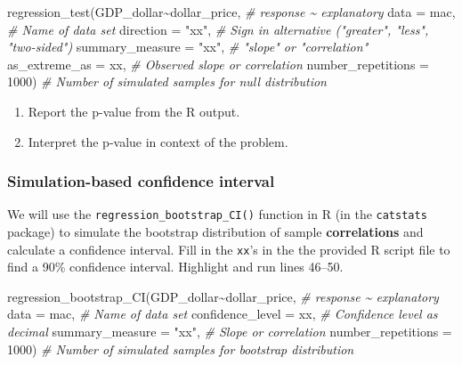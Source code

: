 \documentclass[
]{report}
\newenvironment{Shaded}{\begin{snugshade}}{\end{snugshade}}
\newcommand{\AttributeTok}[1]{\textcolor[rgb]{0.77,0.63,0.00}{#1}}
\newcommand{\CommentTok}[1]{\textcolor[rgb]{0.56,0.35,0.01}{\textit{#1}}}
\newcommand{\DecValTok}[1]{\textcolor[rgb]{0.00,0.00,0.81}{#1}}
\newcommand{\FunctionTok}[1]{\textcolor[rgb]{0.00,0.00,0.00}{#1}}
\newcommand{\NormalTok}[1]{#1}
\newcommand{\SpecialCharTok}[1]{\textcolor[rgb]{0.00,0.00,0.00}{#1}}
\newcommand{\StringTok}[1]{\textcolor[rgb]{0.31,0.60,0.02}{#1}}
\begin{document}
\begin{Shaded}
\begin{Highlighting}[]
\FunctionTok{regression\_test}\NormalTok{(GDP\_dollar}\SpecialCharTok{\textasciitilde{}}\NormalTok{dollar\_price, }\CommentTok{\# response \textasciitilde{} explanatory}
               \AttributeTok{data =}\NormalTok{ mac, }\CommentTok{\# Name of data set}
               \AttributeTok{direction =} \StringTok{"xx"}\NormalTok{, }\CommentTok{\# Sign in alternative ("greater", "less", "two{-}sided")}
               \AttributeTok{summary\_measure  =} \StringTok{"xx"}\NormalTok{, }\CommentTok{\# "slope" or "correlation"}
               \AttributeTok{as\_extreme\_as =}\NormalTok{ xx, }\CommentTok{\# Observed slope or correlation}
               \AttributeTok{number\_repetitions =} \DecValTok{1000}\NormalTok{) }\CommentTok{\# Number of simulated samples for null distribution}
\end{Highlighting}
\end{Shaded}

\begin{enumerate}
\def\labelenumi{\arabic{enumi}.}
\setcounter{enumi}{7}
\item
  Report the p-value from the R output.
  \vspace{0.3in}
\item
  Interpret the p-value in context of the problem.
  \vspace{0.8in}
\end{enumerate}

\hypertarget{simulation-based-confidence-interval-1}{%
\subsubsection*{Simulation-based confidence interval}\label{simulation-based-confidence-interval-1}}

We will use the \texttt{regression\_bootstrap\_CI()} function in R (in the \texttt{catstats} package) to simulate the bootstrap distribution of sample \textbf{correlations} and calculate a confidence interval. Fill in the \texttt{xx}'s in the the provided R script file to find a 90\% confidence interval. Highlight and run lines 46--50.

\begin{Shaded}
\begin{Highlighting}[]
\FunctionTok{regression\_bootstrap\_CI}\NormalTok{(GDP\_dollar}\SpecialCharTok{\textasciitilde{}}\NormalTok{dollar\_price, }\CommentTok{\# response \textasciitilde{} explanatory}
   \AttributeTok{data =}\NormalTok{ mac, }\CommentTok{\# Name of data set}
   \AttributeTok{confidence\_level =}\NormalTok{ xx, }\CommentTok{\# Confidence level as decimal}
   \AttributeTok{summary\_measure =} \StringTok{"xx"}\NormalTok{, }\CommentTok{\# Slope or correlation}
   \AttributeTok{number\_repetitions =} \DecValTok{1000}\NormalTok{) }\CommentTok{\# Number of simulated samples for bootstrap distribution}
\end{Highlighting}
\end{Shaded}
\end{document}
